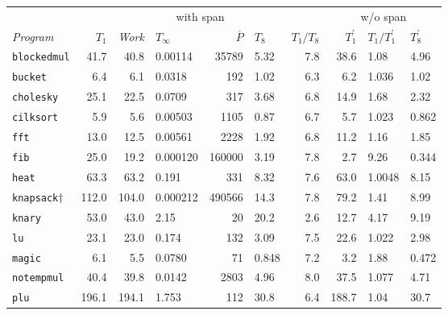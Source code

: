 \newcommand{\p}{\phantom{1}}

\begin{figure}[t]
\begin{center}
  \leavevmode
{\footnotesize
\begin{tabular}{l|rrlrlr|rll} %
 & \multicolumn{6}{c|}{with span} 
 & \multicolumn{3}{c}{w/o span}\\


\textit{Program}     &$T_1$&{\it Work}&$T_\infty$&$\overline{P}$&$T_8$&$T_1/T_8$   &$T^\prime_1$&$T_1/T^\prime_1$&$T^\prime_8$\\
\hline
\texttt{blockedmul}     &     41.7 &  40.8 & 0.00114  & 35789    & \p 5.32  & 7.8        &  38.6 & 1.08   & \p 4.96  \\
\texttt{bucket}         &      6.4 &   6.1 & 0.0318   & 192      & \p 1.02  & 6.3        &   6.2 & 1.036  & \p 1.02  \\
\texttt{cholesky}       &     25.1 &  22.5 & 0.0709   & 317      & \p 3.68  & 6.8        &  14.9 & 1.68   & \p 2.32  \\
\texttt{cilksort}       &      5.9 &   5.6 & 0.00503  & 1105     & \p 0.87  & 6.7        &   5.7 & 1.023  & \p 0.862 \\
\texttt{fft}            &     13.0 &  12.5 & 0.00561  & 2228     & \p 1.92  & 6.8        &  11.2 & 1.16   & \p 1.85  \\
\texttt{fib}            &     25.0 &  19.2 & 0.000120 & 160000   & \p 3.19  & 7.8        &   2.7 & 9.26   & \p 0.344 \\
\texttt{heat}           &     63.3 &  63.2 & 0.191    & 331      & \p 8.32  & 7.6        &  63.0 & 1.0048 & \p 8.15  \\
\texttt{knapsack}$\dagger$ & 112.0 & 104.0 & 0.000212 & 490566   &    14.3  & 7.8        &  79.2 & 1.41   & \p 8.99  \\
\texttt{knary}          &     53.0 &  43.0 & 2.15     & 20       &    20.2  & 2.6        &  12.7 & 4.17   & \p 9.19  \\
\texttt{lu}             &     23.1 &  23.0 & 0.174    & 132      & \p 3.09  & 7.5        &  22.6 & 1.022  & \p 2.98  \\
\texttt{magic}          &      6.1 &   5.5 & 0.0780   & 71       & \p 0.848 & 7.2        &   3.2 & 1.88   & \p 0.472 \\
\texttt{notempmul}      &     40.4 &  39.8 & 0.0142   & 2803     & \p 4.96  & 8.0        &  37.5 & 1.077  & \p 4.71  \\
\texttt{plu}            &    196.1 & 194.1 & 1.753    & 112      &   30.8   & 6.4        & 188.7 & 1.04   &   30.7   \\

\end{tabular}}
\end{center}
\end{figure}
